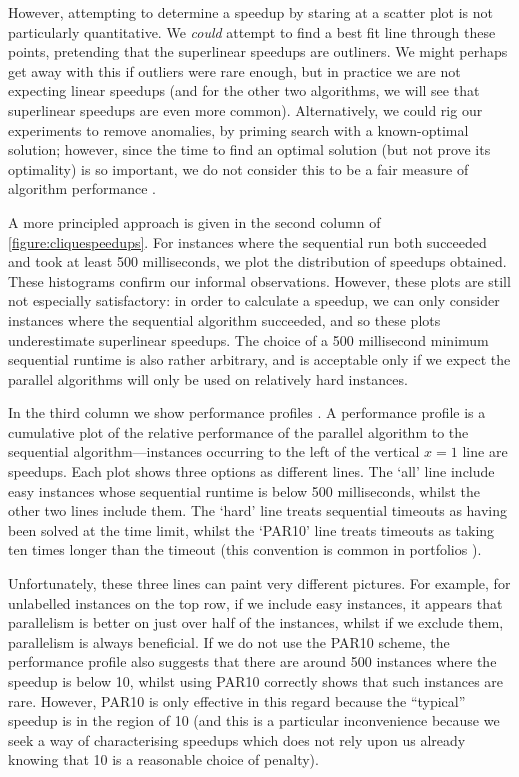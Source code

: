 \documentclass{llncs}
\begin{document}
However, attempting to determine a speedup by staring at a scatter plot is not particularly
quantitative. We \emph{could} attempt to find a best fit line through these points, pretending that
the superlinear speedups are outliners. We might perhaps get away with this if outliers were rare
enough, but in practice we are not expecting linear speedups (and for the other two algorithms, we
will see that superlinear speedups are even more common). Alternatively, we could rig our
experiments to remove anomalies, by priming search with a known-optimal solution; however, since the
time to find an optimal solution (but not prove its optimality) is so important, we do not consider
this to be a fair measure of algorithm performance \cite{DBLP:journals/topc/McCreeshP15}.

A more principled approach is given in the second column of \cref{figure:cliquespeedups}. For
instances where the sequential run both succeeded and took at least 500 milliseconds, we plot the
distribution of speedups obtained. These histograms confirm our informal observations. However,
these plots are still not especially satisfactory: in order to calculate a speedup, we can only
consider instances where the sequential algorithm succeeded, and so these plots underestimate
superlinear speedups. The choice of a 500 millisecond minimum sequential runtime is also rather
arbitrary, and is acceptable only if we expect the parallel algorithms will only be used on
relatively hard instances.

In the third column we show performance profiles \cite{DBLP:journals/mp/DolanM02}. A performance
profile is a cumulative plot of the relative performance of the parallel algorithm to the sequential
algorithm---instances occurring to the left of the vertical $x = 1$ line are speedups. Each plot
shows three options as different lines. The `all' line include easy instances whose sequential
runtime is below 500 milliseconds, whilst the other two lines include them. The `hard' line treats
sequential timeouts as having been solved at the time limit, whilst the `PAR10' line treats timeouts
as taking ten times longer than the timeout (this convention is common in portfolios
\cite{DBLP:conf/aaai/XuHL10}).

Unfortunately, these three lines can paint very different pictures. For example, for unlabelled
instances on the top row, if we include easy instances, it appears that parallelism is better on
just over half of the instances, whilst if we exclude them, parallelism is always beneficial. If we
do not use the PAR10 scheme, the performance profile also suggests that there are around 500
instances where the speedup is below 10, whilst using PAR10 correctly shows that such instances are
rare. However, PAR10 is only effective in this regard because the ``typical'' speedup is in the
region of 10 (and this is a particular inconvenience because we seek a way of characterising
speedups which does not rely upon us already knowing that 10 is a reasonable choice of penalty).
\end{document}
